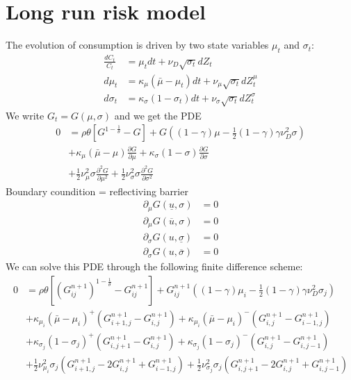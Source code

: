 \documentclass[english]{article}
\begin{document}
\section{Long run risk model}
The evolution of consumption is driven by two state variables $\mu_{t}$ and $\sigma_{t}$:
\begin{align*}
	\frac{dC_{t}}{C_{t}} & =  \mu_{t}dt+\nu_{D}\sqrt{\sigma_{t}}dZ_{t}\\
	d\mu_{t} & =  \kappa_{\mu}(\bar{\mu}-\mu_{t})dt+\nu_{\mu}\sqrt{\sigma_{t}}dZ_{t}^{\mu}\\
	d\sigma_{t} & =  \kappa_{\sigma}(1-\sigma_{t})dt+\nu_{\sigma}\sqrt{\sigma_{t}}dZ_{t}^{\sigma}
\end{align*}
We write $G_t = G(\mu, \sigma)$ and we get the PDE
\begin{align*}
	0&= \rho \theta[G^{1-\frac{1}{\theta}}- G]+G((1-\gamma)\mu-\frac{1}{2}(1-\gamma)\gamma\nu_D^2\sigma)\\
	&+\kappa_{\mu}(\bar{\mu}-\mu)\frac{\partial G}{\partial\mu}+\kappa_{\sigma}(1-\sigma)\frac{\partial G}{\partial\sigma}\\
	&+\frac{1}{2}\nu_{\mu}^{2}\sigma\frac{\partial^{2}G}{\partial\mu^{2}}+\frac{1}{2}\nu_{\sigma}^{2}\sigma \frac{\partial^{2}G}{\partial\sigma^{2}}
\end{align*}
Boundary coundition  = reflectiving barrier
\begin{align*}
	\partial_\mu G(\underline{u}, \sigma) &= 0  \\
	\partial_\mu G(\overline{u}, \sigma) &= 0 \\
	\partial_\sigma G(u, \underline{\sigma}) &= 0  \\
	\partial_\sigma G(u, \overline{\sigma}) &= 0 
\end{align*}
We can solve this PDE through the following finite difference scheme:
\begin{align*}
	0&= \rho \theta[(G_{ij}^{n+1})^{1-\frac{1}{\theta}}- G_{ij}^{{n+1}}]+G_{ij}^{n+1}((1-\gamma)\mu_i-\frac{1}{2}(1-\gamma)\gamma\nu_D^2\sigma_j)\\
	&+\kappa_{\mu_i}(\bar{\mu}-\mu_i)^+(G_{i+1, j}^{n+1}-G_{i, j}^{n+1}) +\kappa_{\mu_i}(\bar{\mu}-\mu_i)^-(G_{i, j}^{n+1}-G_{i-1, j}^{n+1})\\
	&+\kappa_{\sigma_j}(1-\sigma_j)^+(G_{i, j+1}^{n+1}-G_{i,j}^{n+1}) +\kappa_{\sigma_j}(1-\sigma_j)^-(G_{i, j}^{n+1}-G_{i,j-1}^{n+1})\\
	&+\frac{1}{2}\nu_{\mu_i}^{2}\sigma_j(G_{i+1, j}^{n+1} - 2 G_{i, j}^{n+1} + G_{i-1, j}^{n+1})+\frac{1}{2}\nu_{\sigma_j}^{2}\sigma_j(G_{i, j+1}^{n+1} - 2 G_{i, j}^{n+1} + G_{i, j-1}^{n+1})
\end{align*}
\end{document}
